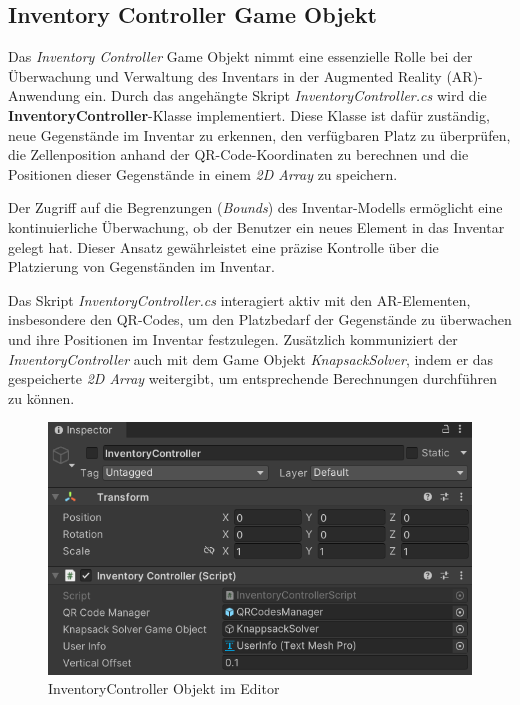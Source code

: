 \subsection{Inventory Controller Game Objekt} 
Das \textit{Inventory Controller} Game Objekt nimmt eine essenzielle Rolle bei der Überwachung und Verwaltung des Inventars
in der Augmented Reality (AR)-Anwendung ein. Durch das angehängte Skript \textit{InventoryController.cs} wird die
\textbf{InventoryController}-Klasse implementiert. Diese Klasse ist dafür zuständig, neue Gegenstände im Inventar zu
erkennen, den verfügbaren Platz zu überprüfen, die Zellenposition anhand der QR-Code-Koordinaten zu berechnen und die
Positionen dieser Gegenstände in einem \textit{2D Array} zu speichern.

Der Zugriff auf die Begrenzungen (\textit{Bounds}) des Inventar-Modells ermöglicht eine kontinuierliche Überwachung, ob
der Benutzer ein neues Element in das Inventar gelegt hat. Dieser Ansatz gewährleistet eine präzise Kontrolle über die
Platzierung von Gegenständen im Inventar.

Das Skript \textit{InventoryController.cs} interagiert aktiv mit den AR-Elementen, insbesondere den QR-Codes, um den
Platzbedarf der Gegenstände zu überwachen und ihre Positionen im Inventar festzulegen. Zusätzlich kommuniziert der
\textit{InventoryController} auch mit dem Game Objekt \textit{KnapsackSolver}, indem er das gespeicherte \textit{2D Array}
weitergibt, um entsprechende Berechnungen durchführen zu können.

\begin{figure}[H]
    \centering
    \includegraphics[scale=0.8]{images/invCon_Editor}
    \caption{InventoryController Objekt im Editor}
    \label{fig:InventoryController_Editor}
\end{figure}

